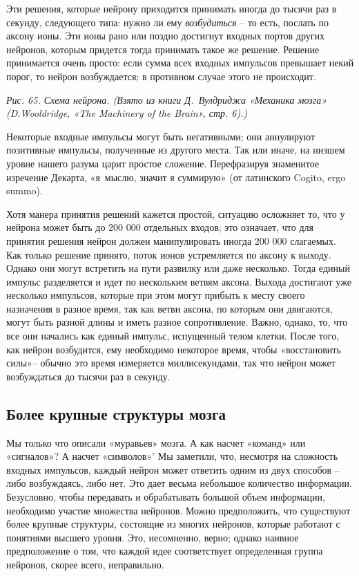 \documentclass[../main.tex]{subfiles}
\begin{document}
Эти решения, которые нейрону приходится принимать иногда до тысячи раз в секунду, следующего типа: нужно ли ему \emph{возбудиться} \--- то есть, послать по аксону ионы. Эти ионы рано или поздно достигнут входных портов других нейронов, которым придется тогда принимать такое же решение. Решение принимается очень просто: если сумма всех входных импульсов превышает некий порог, то нейрон возбуждается; в противном случае этого не происходит.

\emph{Рис. 65. Схема нейрона. (Взято из книги Д.~Вулдриджа «Механика мозга» (D.Wooldridge, «The Machinery of the Brain», стр. 6).)}

Некоторые входные импульсы могут быть негативными; они аннулируют позитивные импульсы, полученные из другого места. Так или иначе, на низшем уровне нашего разума царит простое сложение. Перефразируя знаменитое изречение Декарта, «я~мыслю, значит я суммирую» (от латинского Cogito, ergo summo).

Хотя манера принятия решений кажется простой, ситуацию осложняет то, что у нейрона может быть до 200 000 отдельных входов; это означает, что для принятия решения нейрон должен манипулировать иногда 200 000 слагаемых. Как только решение принято, поток ионов устремляется по аксону к выходу. Однако они могут встретить на пути развилку или даже несколько. Тогда единый импульс разделяется и идет по нескольким ветвям аксона. Выхода достигают уже несколько импульсов, которые при этом могут прибыть к месту своего назначения в разное время, так как ветви аксона, по которым они двигаются, могут быть разной длины и иметь разное сопротивление. Важно, однако, то, что все они начались как единый импульс, испущенный телом клетки. После того, как нейрон возбудится, ему необходимо некоторое время, чтобы «восстановить силы»\--- обычно это время измеряется миллисекундами, так что нейрон может возбуждаться до тысячи раз в секунду.


\subsection{Более крупные структуры мозга}

Мы только что описали «муравьев» мозга. А как насчет «команд» или «сигналов»? А насчет «символов»' Мы заметили, что, несмотря на сложность входных импульсов, каждый нейрон может ответить одним из двух способов \--- либо возбуждаясь, либо нет. Это дает весьма небольшое количество информации. Безусловно, чтобы передавать и обрабатывать большой объем информации, необходимо участие множества нейронов. Можно предположить, что существуют более крупные структуры, состоящие из многих нейронов, которые работают с понятиями высшего уровня. Это, несомненно, верно; однако наивное предположение о том, что каждой идее соответствует определенная группа нейронов, скорее всего, неправильно.
\end{document}
